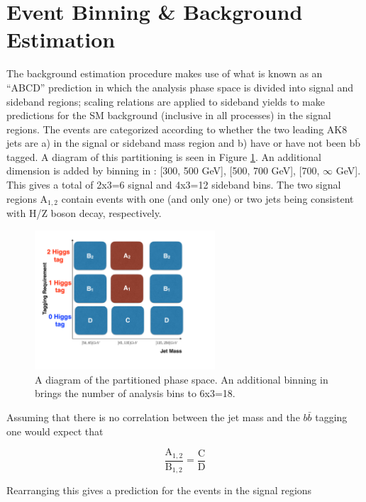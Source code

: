 \section{Event Binning \& Background Estimation}

The background estimation procedure makes use of what is known as an ``ABCD'' prediction in which the analysis phase space is divided into signal and sideband regions; scaling relations are applied to sideband yields to make predictions for the SM background (inclusive in all processes) in the signal regions. The events are categorized according to whether the two leading AK8 jets are a) in the signal or sideband mass region and b) have or have not been $\mathrm{b}\bar{\mathrm{b}}$ tagged.  A diagram of this partitioning is seen in Figure \ref{fig:abcd}. An additional dimension is added by binning in \ptmiss: [300, 500 GeV], [500, 700 GeV], [700, $\infty$ GeV]. This gives a total of 2x3=6 signal and 4x3=12 sideband bins. The two signal regions $\mathrm{A}_{1, 2}$ contain events with one (and only one) or two jets being consistent with H/Z boson decay, respectively.

\begin{figure}[hbp!]
\centering
\includegraphics[width=0.6\textwidth]{figs/SUS17006/CMS-SUS-17-006_Figure-aux_002.pdf}
\caption{A diagram of the partitioned phase space. An additional binning in \ptmiss brings the number of analysis bins to 6x3=18.}
\label{fig:abcd}
\end{figure}

Assuming that there is no correlation between the jet mass and the $b\bar{b}$ tagging one would expect that

\begin{equation}
\frac{\mathrm{A}_{1, 2}}{\mathrm{B}_{1, 2}} = \frac{\mathrm{C}}{\mathrm{D}}
\end{equation}

Rearranging this gives a prediction for the events in the signal regions

